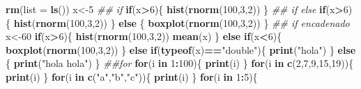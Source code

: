 \documentclass[
]{book}
\newenvironment{Shaded}{\begin{snugshade}}{\end{snugshade}}
\newcommand{\CommentTok}[1]{\textcolor[rgb]{0.56,0.35,0.01}{\textit{#1}}}
\newcommand{\ControlFlowTok}[1]{\textcolor[rgb]{0.13,0.29,0.53}{\textbf{#1}}}
\newcommand{\DataTypeTok}[1]{\textcolor[rgb]{0.13,0.29,0.53}{#1}}
\newcommand{\DecValTok}[1]{\textcolor[rgb]{0.00,0.00,0.81}{#1}}
\newcommand{\KeywordTok}[1]{\textcolor[rgb]{0.13,0.29,0.53}{\textbf{#1}}}
\newcommand{\NormalTok}[1]{#1}
\newcommand{\OperatorTok}[1]{\textcolor[rgb]{0.81,0.36,0.00}{\textbf{#1}}}
\newcommand{\StringTok}[1]{\textcolor[rgb]{0.31,0.60,0.02}{#1}}
\begin{document}
\begin{Shaded}
\begin{Highlighting}[]
\KeywordTok{rm}\NormalTok{(}\DataTypeTok{list =} \KeywordTok{ls}\NormalTok{())}
\NormalTok{x<-}\DecValTok{5}
\CommentTok{## if}
\ControlFlowTok{if}\NormalTok{(x}\OperatorTok{>}\DecValTok{6}\NormalTok{)\{}
  \KeywordTok{hist}\NormalTok{(}\KeywordTok{rnorm}\NormalTok{(}\DecValTok{100}\NormalTok{,}\DecValTok{3}\NormalTok{,}\DecValTok{2}\NormalTok{))}
\NormalTok{\}}
\CommentTok{## if else}
\ControlFlowTok{if}\NormalTok{(x}\OperatorTok{>}\DecValTok{6}\NormalTok{)\{}
  \KeywordTok{hist}\NormalTok{(}\KeywordTok{rnorm}\NormalTok{(}\DecValTok{100}\NormalTok{,}\DecValTok{3}\NormalTok{,}\DecValTok{2}\NormalTok{))}
\NormalTok{\} }\ControlFlowTok{else}\NormalTok{ \{}
  \KeywordTok{boxplot}\NormalTok{(}\KeywordTok{rnorm}\NormalTok{(}\DecValTok{100}\NormalTok{,}\DecValTok{3}\NormalTok{,}\DecValTok{2}\NormalTok{))}
\NormalTok{\}}
\CommentTok{## if encadenado}
\NormalTok{x<-}\DecValTok{60}
\ControlFlowTok{if}\NormalTok{(x}\OperatorTok{>}\DecValTok{6}\NormalTok{)\{}
  \KeywordTok{hist}\NormalTok{(}\KeywordTok{rnorm}\NormalTok{(}\DecValTok{100}\NormalTok{,}\DecValTok{3}\NormalTok{,}\DecValTok{2}\NormalTok{))}
  \KeywordTok{mean}\NormalTok{(x)}
\NormalTok{\} }\ControlFlowTok{else} \ControlFlowTok{if}\NormalTok{(x}\OperatorTok{<}\DecValTok{6}\NormalTok{)\{}
  \KeywordTok{boxplot}\NormalTok{(}\KeywordTok{rnorm}\NormalTok{(}\DecValTok{100}\NormalTok{,}\DecValTok{3}\NormalTok{,}\DecValTok{2}\NormalTok{))}
\NormalTok{\} }\ControlFlowTok{else} \ControlFlowTok{if}\NormalTok{(}\KeywordTok{typeof}\NormalTok{(x)}\OperatorTok{==}\StringTok{"double"}\NormalTok{)\{}
  \KeywordTok{print}\NormalTok{(}\StringTok{"hola"}\NormalTok{)}
\NormalTok{\} }\ControlFlowTok{else}\NormalTok{ \{}
  \KeywordTok{print}\NormalTok{(}\StringTok{"hola hola"}\NormalTok{)}
\NormalTok{\}}
\CommentTok{##for}
\ControlFlowTok{for}\NormalTok{(i }\ControlFlowTok{in} \DecValTok{1}\OperatorTok{:}\DecValTok{100}\NormalTok{)\{}
  \KeywordTok{print}\NormalTok{(i)}
\NormalTok{\}}
\ControlFlowTok{for}\NormalTok{(i }\ControlFlowTok{in} \KeywordTok{c}\NormalTok{(}\DecValTok{2}\NormalTok{,}\DecValTok{7}\NormalTok{,}\DecValTok{9}\NormalTok{,}\DecValTok{15}\NormalTok{,}\DecValTok{19}\NormalTok{))\{}
  \KeywordTok{print}\NormalTok{(i)}
\NormalTok{\}  }
\ControlFlowTok{for}\NormalTok{(i }\ControlFlowTok{in} \KeywordTok{c}\NormalTok{(}\StringTok{"a"}\NormalTok{,}\StringTok{"b"}\NormalTok{,}\StringTok{"c"}\NormalTok{))\{}
  \KeywordTok{print}\NormalTok{(i)}
\NormalTok{\}  }
\ControlFlowTok{for}\NormalTok{(i }\ControlFlowTok{in} \DecValTok{1}\OperatorTok{:}\DecValTok{5}\NormalTok{)\{}

\end{Highlighting}
\end{Shaded}
\end{document}
